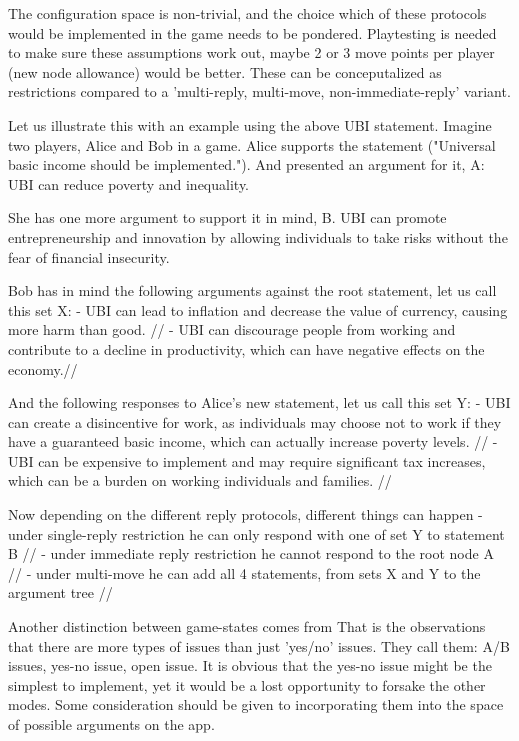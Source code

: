 \documentclass{report}
\begin{document}
The configuration space is non-trivial, and the choice which of these protocols would be implemented in the game needs to be pondered.
Playtesting is needed to make sure these assumptions work out, maybe 2 or 3 move points per player (new node allowance) would be better.
These can be conceputalized as restrictions compared to a 'multi-reply, multi-move, non-immediate-reply' variant.

Let us illustrate this with an example using the above UBI statement. Imagine two players, Alice and Bob in a game.
Alice supports the statement ("Universal basic income should be implemented."). And presented an argument for it, A:
UBI can reduce poverty and inequality.

She has one more argument to support it in mind, B.
UBI can promote entrepreneurship and innovation by allowing individuals to take risks without the fear of financial insecurity.

Bob has in mind the following arguments against the root statement, let us call this set X:
- UBI can lead to inflation and decrease the value of currency, causing more harm than good. //
- UBI can discourage people from working and contribute to a decline in productivity, which can have  negative effects on the economy.//

And the following responses to Alice's new statement, let us call this set Y:
- UBI can create a disincentive for work, as individuals may choose not to work if they have a guaranteed basic income, which can actually increase poverty levels. //
- UBI can be expensive to implement and may require significant tax increases, which can be a burden on working individuals and families. //

Now depending on the different reply protocols, different things can happen
- under single-reply restriction he can only respond with one of set Y to statement B //
- under immediate reply restriction he cannot respond to the root node A //
- under multi-move he can add all 4 statements, from sets X and Y to the argument tree //

Another distinction between game-states comes from \cite{wyner_argument_2015}
That is the observations that there are more types of issues than just 'yes/no' issues.
They call them: A/B issues, yes-no issue, open issue.
It is obvious that the yes-no issue might be the simplest to implement, yet it would be a lost opportunity to forsake the other modes.
Some consideration should be given to incorporating them into the space of possible arguments on the app.
\end{document}
